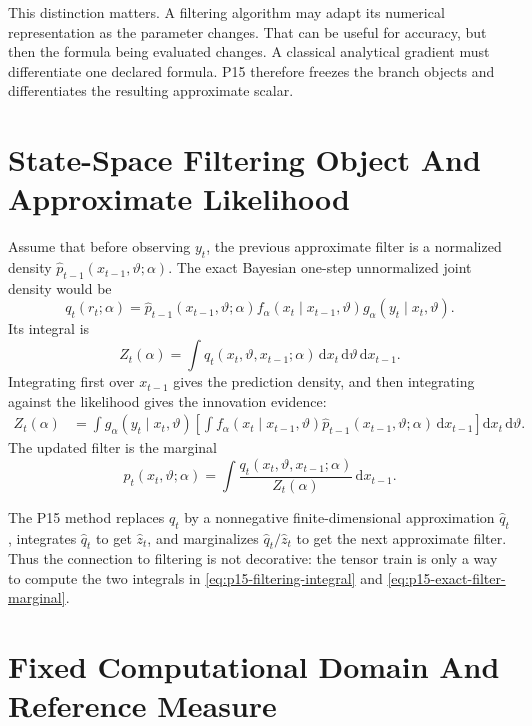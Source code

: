 \documentclass[11pt]{article}
\newcommand{\dd}{\mathrm{d}}
\theoremstyle{definition}
\theoremstyle{remark}
\renewcommand{\[}{\begin{equation}}
\renewcommand{\]}{\end{equation}}
\begin{document}
This distinction matters.  A filtering algorithm may adapt its numerical
representation as the parameter changes.  That can be useful for accuracy, but
then the formula being evaluated changes.  A classical analytical gradient
must differentiate one declared formula.  P15 therefore freezes the branch
objects and differentiates the resulting approximate scalar.

\section{State-Space Filtering Object And Approximate Likelihood}

Assume that before observing \(y_t\), the previous approximate filter is a
normalized density \(\widehat p_{t-1}(x_{t-1},\vartheta;\alpha)\).  The exact
Bayesian one-step unnormalized joint density would be
\[
  q_t(r_t;\alpha)
  =
  \widehat p_{t-1}(x_{t-1},\vartheta;\alpha)
  f_\alpha(x_t\mid x_{t-1},\vartheta)
  g_\alpha(y_t\mid x_t,\vartheta).
  \label{eq:p15-qt}
\]
Its integral is
\[
  Z_t(\alpha)
  =
  \int q_t(x_t,\vartheta,x_{t-1};\alpha)
  \,\dd x_t\,\dd\vartheta\,\dd x_{t-1}.
  \label{eq:p15-exact-Z}
\]
Integrating first over \(x_{t-1}\) gives the prediction density, and then
integrating against the likelihood gives the innovation evidence:
\[
\begin{aligned}
  Z_t(\alpha)
  &=
  \int g_\alpha(y_t\mid x_t,\vartheta)
  \left[
  \int f_\alpha(x_t\mid x_{t-1},\vartheta)
       \widehat p_{t-1}(x_{t-1},\vartheta;\alpha)\,\dd x_{t-1}
  \right]\dd x_t\,\dd\vartheta .
\end{aligned}
  \label{eq:p15-filtering-integral}
\]
The updated filter is the marginal
\[
  p_t(x_t,\vartheta;\alpha)
  =
  \int
  \frac{q_t(x_t,\vartheta,x_{t-1};\alpha)}
       {Z_t(\alpha)}
  \,\dd x_{t-1}.
  \label{eq:p15-exact-filter-marginal}
\]

The P15 method replaces \(q_t\) by a nonnegative finite-dimensional
approximation \(\widehat q_t\), integrates \(\widehat q_t\) to get
\(\widehat z_t\), and marginalizes \(\widehat q_t/\widehat z_t\) to get the
next approximate filter.  Thus the connection to filtering is not decorative:
the tensor train is only a way to compute the two integrals in
\eqref{eq:p15-filtering-integral} and \eqref{eq:p15-exact-filter-marginal}.

\section{Fixed Computational Domain And Reference Measure}
\end{document}
